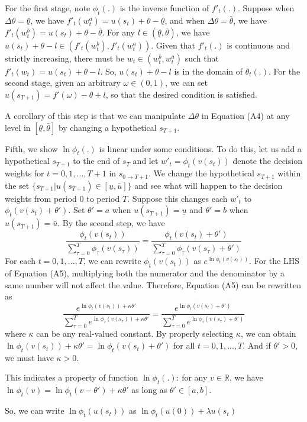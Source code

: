\documentclass[
  12pt,
]{article}
\begin{document}
For the first stage, note \(\phi_t(.)\) is the inverse function of
\(f'_t(.)\). Suppose when \(\Delta\theta=\underline{\theta}\), we have
\(f'_t(w^{a}_t)=u(s_t)+\theta-\underline{\theta}\), and when
\(\Delta\theta=\bar{\theta}\), we have
\(f'_t(w^{b}_t)=u(s_t)+\theta-\bar{\theta}\). For any
\(l\in(\underline{\theta},\bar{\theta})\), we have
\(u(s_t)+\theta-l \in (f'_t(w^b_t),f'_t(w^a_t))\). Given that
\(f'_t(.)\) is continuous and strictly increasing, there must be
\(w_t\in(w^b_t,w^a_t)\) such that \(f'_t(w_t)=u(s_t)+\theta-l\). So,
\(u(s_t)+\theta-l\) is in the domain of \(\theta_t(.)\). For the second
stage, given an arbitrary \(\omega\in(0,1)\), we can set
\(u(s_{T+1})=f'(\omega)-\theta+l\), so that the desired condition is
satisfied.

A corollary of this step is that we can manipulate \(\Delta \theta\) in
Equation (A4) at any level in \([\underline{\theta},\bar{\theta}]\) by
changing a hypothetical \(s_{T+1}\).

Fifth, we show \(\ln \phi_t(.)\) is linear under some conditions. To do
this, let us add a hypothetical \(s_{T+1}\) to the end of \(s_T\) and
let \(w'_t=\phi_t(v(s_t))\) denote the decision weights for
\(t=0,1,…,T+1\) in \(s_{0\rightarrow T+1}\). We change the hypothetical
\(s_{T+1}\) within the set
\(\{s_{T+1}|u(s_{T+1})\in[\underline{u},\bar{u}]\}\) and see what will
happen to the decision weights from period 0 to period \(T\). Suppose
this changes each \(w'_t\) to \(\phi_t(v(s_t)+\theta')\). Set
\(\theta'=a\) when \(u(s_{T+1})=\underline{u}\) and \(\theta'=b\) when
\(u(s_{T+1})=\bar{u}\). By the second step, we have\[\tag{A5}
\frac{\phi_t(v(s_t))}{\sum_{\tau=0}^{T}\phi_\tau(v(s_\tau))} = \frac{\phi_t(v(s_t)+\theta')}{\sum_{\tau=0}^{T}\phi_\tau(v(s_\tau)+\theta')}
\]For each \(t=0,1,...,T\), we can rewrite \(\phi_t(v(s_t))\) as
\(e^{\ln \phi_t(v(s_t))}\). For the LHS of Equation (A5), multiplying
both the numerator and the denominator by a same number will not affect
the value. Therefore, Equation (A5) can be rewritten as \[
\frac{e^{\ln\phi_t(v(s_t))+\kappa\theta'}}{\sum_{\tau=0}^{T}e^{\ln\phi_\tau(v(s_\tau))+\kappa\theta'}} = \frac{e^{\ln\phi_t(v(s_t)+\theta')}}{\sum_{\tau=0}^{T}e^{\ln\phi_\tau(v(s_\tau)+\theta')}}
\]where \(\kappa\) can be any real-valued constant. By properly
selecting \(\kappa\), we can obtain
\(\ln \phi_t(v(s_t))+\kappa\theta'=\ln \phi_t(v(s_t)+\theta')\) for all
\(t=0,1,...,T\). And if \(\theta'>0\), we must have \(\kappa>0\).

This indicates a property of function \(\ln \phi_t(.)\): for any
\(v\in \mathbb{R}\), we have
\(\ln \phi_t(v)=\ln \phi_t(v-\theta')+\kappa\theta'\) as long as
\(\theta' \in [a,b]\).

So, we can write \(\ln \phi_t (u(s_t))\) as
\(\ln \phi_t(u(0))+\lambda u(s_t)\)
\end{document}
